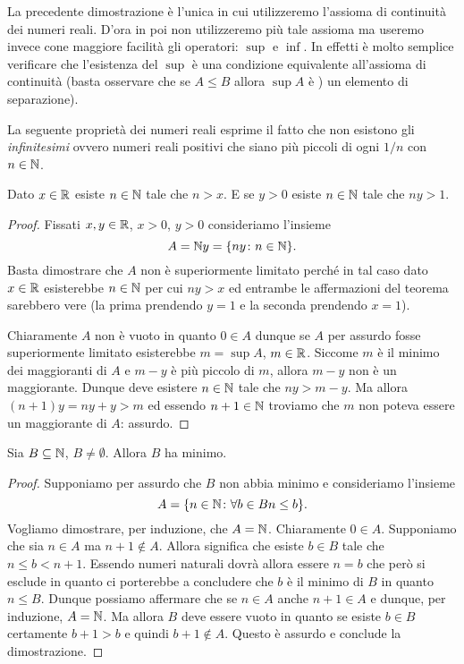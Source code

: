 La precedente dimostrazione è l'unica in cui 
utilizzeremo l'assioma di continuità dei numeri reali.
D'ora in poi non utilizzeremo più tale assioma ma useremo invece
cone maggiore facilità gli operatori: $\sup$ e $\inf$.
In effetti è molto semplice verificare che l'esistenza del $\sup$
è una condizione equivalente all'assioma di continuità
(basta osservare che se $A\le B$ allora $\sup A$ è )
un elemento di separazione).

La seguente proprietà dei numeri reali esprime il fatto
che non esistono gli \emph{infinitesimi} ovvero numeri reali positivi
che siano più piccoli di ogni $1/n$ con $n\in \mathbb N$.

\begin{theorem}
\mymark{**}%
%
  Dato $x\in \mathbb R$ esiste $n\in \mathbb N$ tale che $n > x$.
  E se $y>0$ esiste $n\in \mathbb N$ tale che $ny>1$.
\end{theorem}
%
\begin{proof}
\mymark{*}
  Fissati $x,y\in \mathbb R$, $x>0$, $y>0$ consideriamo l'insieme 
  \[
     A = \mathbb N y = {\left\{ ny\colon n\in \mathbb N \right\}}.
  \]
  Basta dimostrare che $A$ non è superiormente limitato perché 
  in tal caso dato $x\in \mathbb R$ esisterebbe $n\in \mathbb N$ per cui $ny> x$
  ed entrambe le affermazioni del teorema sarebbero vere (la prima 
  prendendo $y=1$ e la seconda prendendo $x=1$).

  Chiaramente $A$ non è vuoto in quanto $0\in A$ dunque se $A$ 
  per assurdo fosse superiormente limitato esisterebbe 
  $m=\sup A$, $m\in \mathbb R$. 
  Siccome $m$ è il minimo dei maggioranti di $A$
  e $m-y$ è più piccolo di $m$, allora $m-y$ non è un maggiorante. 
  Dunque deve esistere $n\in \mathbb N$ tale che $ny>m-y$.
  Ma allora $(n+1)y = ny + y > m$ ed essendo $n+1\in \mathbb N$ troviamo che $m$
  non poteva essere un maggiorante di $A$: assurdo.
\end{proof}

\begin{theorem}
  Sia $B\subseteq \mathbb N$, $B\neq \emptyset$. 
  Allora $B$ ha minimo.
\end{theorem}
%
\begin{proof}
  Supponiamo per assurdo che $B$ non abbia minimo e 
  consideriamo l'insieme
  \[
     A = {\left\{ n\in \mathbb N\colon \forall b \in B n\le b \right\}}.
  \]
  Vogliamo dimostrare, per induzione, che $A=\mathbb N$.
  Chiaramente $0\in A$. 
  Supponiamo che sia $n\in A$ ma $n+1\not \in A$.
  Allora significa che esiste $b\in B$ tale che $n\le b < n+1$.
  Essendo numeri naturali dovrà allora essere $n=b$ che però si esclude in quanto
  ci porterebbe a concludere che $b$ è il minimo di $B$ in quanto $n\le B$.
  Dunque possiamo affermare che se $n\in A$ anche $n+1\in A$ 
  e dunque, per induzione, $A=\mathbb N$. 
  Ma allora $B$ deve essere vuoto in quanto se esiste $b\in B$ 
  certamente $b+1>b$ e quindi $b+1\not \in A$. 
  Questo è assurdo e conclude la dimostrazione.
\end{proof}

